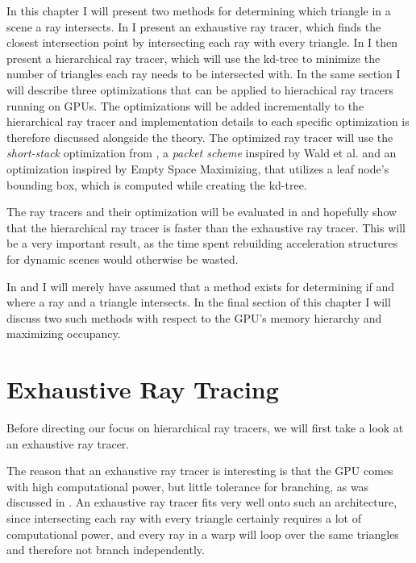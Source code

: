 In this chapter I will present two methods for determining which triangle in a
scene a ray intersects. In  I present an exhaustive
ray tracer, which finds the closest intersection point by intersecting each ray
with every triangle. In  I then present a
hierarchical ray tracer, which will use the kd-tree to minimize the number of
triangles each ray needs to be intersected with. In the same section I will
describe three optimizations that can be applied to hierachical ray tracers
running on GPUs. The optimizations will be added incrementally to the
hierarchical ray tracer and implementation details to each specific optimization
is therefore discussed alongside the theory. The optimized ray tracer will use
the \textit{short-stack} optimization from \horn, a \textit{packet scheme}
inspired by Wald et al. and an optimization inspired
by Empty Space Maximizing, that utilizes a leaf node's bounding box, which is
computed while creating the kd-tree.

The ray tracers and their optimization will be evaluated in
 and hopefully show that the hierarchical ray tracer is
faster than the exhaustive ray tracer. This will be a very important result, as
the time spent rebuilding acceleration structures for dynamic scenes would
otherwise be wasted.

In  and  I will
merely have assumed that a method exists for determining if and where a ray and
a triangle intersects. In the final section of this chapter I will discuss two
such methods with respect to the GPU's memory hierarchy and maximizing
occupancy.



\section{Exhaustive Ray Tracing} \label{sec:exhaustive}

Before directing our focus on hierarchical ray tracers, we will first
take a look at an exhaustive ray tracer.


The reason that an exhaustive ray tracer is interesting is that the GPU comes
with high computational power, but little tolerance for branching, as was
discussed in . An exhaustive ray tracer fits
very well onto such an architecture, since intersecting each ray with every
triangle certainly requires a lot of computational power, and every ray in a
warp will loop over the same triangles and therefore not branch independently.

